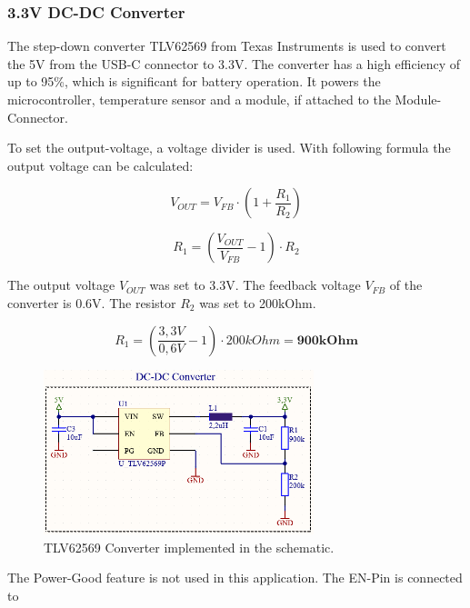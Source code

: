     \subsubsection{3.3V DC-DC Converter}

    The  step-down converter TLV62569 from Texas Instruments is used to convert 
    the 5V from the USB-C connector to 3.3V. The converter has a high efficiency
    of up to 95\%, which is significant for battery operation. It powers the
    microcontroller, temperature sensor and a module, if attached to the
    Module-Connector.

    To set the output-voltage, a voltage divider is used. With following formula
    the output voltage can be calculated:

    \begin{equation}
        V_{OUT} = V_{FB} \cdot (1 + \frac{R_1}{R_2}) 
    \end{equation}

    \begin{equation}
        R_1 = (\frac{V_{OUT}}{V_{FB}} - 1) \cdot {R_2} 
    \end{equation}

    The output voltage $V_{OUT}$ was set to 3.3V. The feedback voltage $V_{FB}$ 
    of the converter is 0.6V. The resistor $R_2$ was set to 200kOhm.

    \begin{equation}
        R_1 = (\frac{3,3V}{0,6V} - 1) \cdot {200kOhm} = \textbf{900kOhm}
    \end{equation}
    
    \begin{figure}[H]
        \centering
        \includegraphics[width=0.7\textwidth]{assets/HW/DC-DC-schematic.png}
        \caption{TLV62569 Converter implemented in the schematic.}
    \end{figure}

    The Power-Good feature is not used in this application. The EN-Pin is connected to

